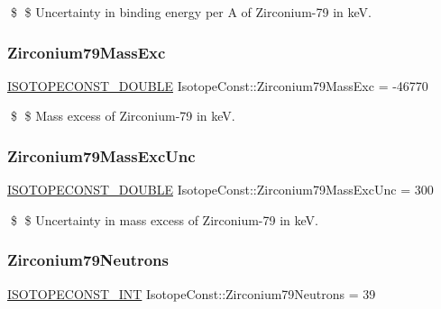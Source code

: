 \$ \$ Uncertainty in binding energy per A of Zirconium-\/79 in keV. \mbox{\label{group___isotope_const-_zirconium-_zr79_gaf2ef0be99d6ea3f2467356e7bd440b50}} 
\subsubsection{\texorpdfstring{Zirconium79\+Mass\+Exc}{Zirconium79MassExc}}
{\footnotesize\ttfamily \mbox{\hyperlink{group___isotope_const-_macros_ga8f45a7272ce02c0b4c65c44636ed719a}{I\+S\+O\+T\+O\+P\+E\+C\+O\+N\+S\+T\+\_\+\+D\+O\+U\+B\+LE}} Isotope\+Const\+::\+Zirconium79\+Mass\+Exc = -\/46770}

\$ \$ Mass excess of Zirconium-\/79 in keV. \mbox{\label{group___isotope_const-_zirconium-_zr79_gac27630f399c4ecde1515d7a6450e8ee5}} 
\subsubsection{\texorpdfstring{Zirconium79\+Mass\+Exc\+Unc}{Zirconium79MassExcUnc}}
{\footnotesize\ttfamily \mbox{\hyperlink{group___isotope_const-_macros_ga8f45a7272ce02c0b4c65c44636ed719a}{I\+S\+O\+T\+O\+P\+E\+C\+O\+N\+S\+T\+\_\+\+D\+O\+U\+B\+LE}} Isotope\+Const\+::\+Zirconium79\+Mass\+Exc\+Unc = 300}

\$ \$ Uncertainty in mass excess of Zirconium-\/79 in keV. \mbox{\label{group___isotope_const-_zirconium-_zr79_ga3026bd27710afa7d2a97ef9d8fdbfac5}} 
\subsubsection{\texorpdfstring{Zirconium79\+Neutrons}{Zirconium79Neutrons}}
{\footnotesize\ttfamily \mbox{\hyperlink{group___isotope_const-_macros_ga5f18360b3e99483a35c32d789e62621c}{I\+S\+O\+T\+O\+P\+E\+C\+O\+N\+S\+T\+\_\+\+I\+NT}} Isotope\+Const\+::\+Zirconium79\+Neutrons = 39}

